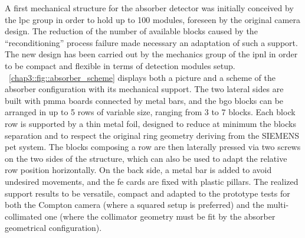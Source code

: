 A first mechanical structure for the absorber detector was initially conceived by the \gls{lpc} group in order to hold up to 100 modules, foreseen by the original camera design. The reduction of the number of available blocks caused by the \enquote{reconditioning} process failure made necessary an adaptation of such a support. The new design has been carried out by the mechanics group of the \gls{ipnl} in order to be compact and flexible in terms of detection modules setup. \figurename~\ref{chap3::fig::absorber_scheme} displays both a picture and a scheme of the absorber configuration with its mechanical support. The two lateral sides are built with \gls{pmma} boards connected by metal bars, and the \gls{bgo} blocks can be arranged in up to 5 rows of variable size, ranging from 3 to 7 blocks. Each block row is supported by a thin metal foil, designed to reduce at minimum the blocks separation and to respect the original ring geometry deriving from the SIEMENS \gls{pet} system. The blocks composing a row are then laterally pressed via two screws on the two sides of the structure, which can also be used to adapt the relative row position horizontally. On the back side, a metal bar is added to avoid undesired movements, and the \gls{fe} cards are fixed with plastic pillars. The realized support results to be versatile, compact and adapted to the prototype tests for both the Compton camera (where a squared setup is preferred) and the multi-collimated one (where the collimator geometry must be fit by the absorber geometrical configuration).       


